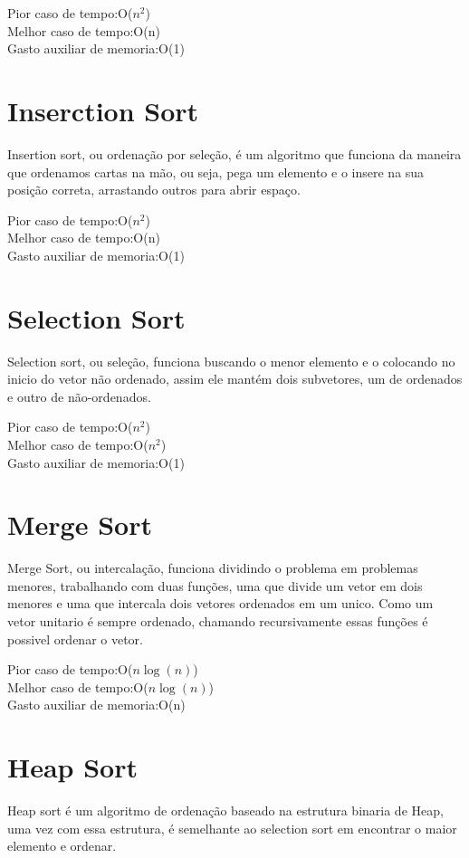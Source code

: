 \noindent Pior caso de tempo:O($n^2$)\\
Melhor caso de tempo:O(n)\\
Gasto auxiliar de memoria:O(1)


\section{Inserction Sort}
\label{sec:inserction_sort}
Insertion sort, ou ordenação por seleção, é um algoritmo que funciona da maneira que ordenamos cartas na mão, ou seja, pega um elemento e o insere na sua posição correta, arrastando outros para abrir espaço.
\cite{GeeksforGeeksins}

\noindent Pior caso de tempo:O($n^2$)\\
Melhor caso de tempo:O(n)\\
Gasto auxiliar de memoria:O(1)

\section{Selection Sort}
\label{sec:selection_sort}
Selection sort, ou seleção, funciona buscando o menor elemento e o colocando no inicio do vetor não ordenado, assim ele mantém dois subvetores, um de ordenados e outro de não-ordenados.

\noindent Pior caso de tempo:O($n^2$)\\
Melhor caso de tempo:O($n^2$)\\
Gasto auxiliar de memoria:O(1)

\section{Merge Sort}
\label{sec:merge_sort}
Merge Sort, ou intercalação, funciona dividindo o problema em problemas menores, trabalhando com duas funções, uma que divide um vetor em dois menores e uma que intercala dois vetores ordenados em um unico. Como um vetor unitario é sempre ordenado, chamando recursivamente essas funções é possivel ordenar o vetor.

\noindent Pior caso de tempo:O($n\log(n)$)\\
Melhor caso de tempo:O($n\log(n)$)\\
Gasto auxiliar de memoria:O(n)


\section{Heap Sort}
\label{sec:heap_sort}
Heap sort é um algoritmo de ordenação baseado na estrutura binaria de Heap, uma vez com essa estrutura, é semelhante ao selection sort em encontrar o maior elemento e ordenar.

